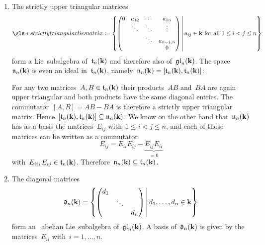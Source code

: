 \begin{examples}
\begin{enumerate}
    \item
      The strictly upper triangular matrices
      \[
        \gls*{strictly triangular lie matrix}
        \defined
        \left\{
          \begin{pmatrix}
              0
            & a_{12}
            & \cdots
            & a_{1n}
            \\
              {}
            & \ddots
            & \ddots
            & \vdots
            \\
              {}
            & {}
            & \ddots
            & a_{n-1,n}
            \\
              {}
            & {}
            & {}
            & 0
          \end{pmatrix}
        \suchthat*
          \text{$a_{ij} \in \kf$ for all~$1 \leq i < j \leq n$}
        \right\}
      \]
      form a Lie~subalgebra of~$\mathfrak{t}_n(\mathbf{k})$ and therefore also of~$\mathfrak{gl}_n(\mathbf{k})$.
      The space~$\mathfrak{n}_n(\mathbf{k})$ is even an ideal in~$\mathfrak{t}_n(\mathbf{k})$, namely~$\mathfrak{n}_n(\mathbf{k}) = [\mathfrak{t}_n(\mathbf{k}), \mathfrak{t}_n(\mathbf{k})]$:
    
      For any two matrices~$A, B \in \mathfrak{t}_n(\mathbf{k})$ their products~$AB$ and~$BA$ are again upper triangular and both products have the same diagonal entries.
      The commutator~$[A,B] = AB - BA$ is therefore a strictly upper triangular matrix.
      Hence~$[\mathfrak{t}_n(\mathbf{k}), \mathfrak{t}_n(\mathbf{k})] \subseteq \mathfrak{n}_n(\mathbf{k})$.
      We know on the other hand that~$\mathfrak{n}_n(\mathbf{k})$ has as a basis the matrices~$E_{ij}$ with~$1 \leq i < j \leq n$, and each of those matrices can be written as a commutator
      \[
        E_{ij}
        =
        E_{ii} E_{ij} - \underbrace{ E_{ij} E_{ii} }_{= 0}
      \]
      with~$E_{ii}, E_{ij} \in \mathfrak{t}_n(\mathbf{k})$.
      Therefore~$\mathfrak{n}_n(\mathbf{k}) \subseteq \mathfrak{t}_n(\mathbf{k})$.
      
    \item
      The diagonal matrices
      \[
        \dlie_n(\kf)
        =
        \left\{
          \begin{pmatrix}
              d_1
            & {}
            & {}
            \\
              {}
            & \ddots
            & {}
            \\
              {}
            & {}
            & d_n
          \end{pmatrix}
        \suchthat*
          d_1, \dotsc, d_n \in \kf
        \right\}
      \]
      form an~{} abelian Lie~subalgebra of~$\mathfrak{gl}_n(\mathbf{k})$.
      A basis of~$\mathfrak{d}_n(\mathbf{k})$ is given by the matrices~$E_{ii}$ with~$i = 1, \dotsc, n$.
  \end{enumerate}
\end{examples}



